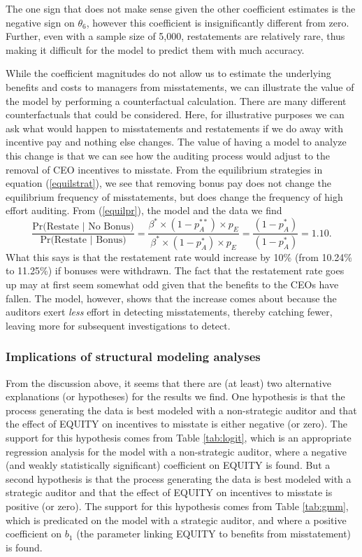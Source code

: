 The one sign that does not make sense given the other coefficient estimates is the negative sign on $\theta_6$, however this coefficient is insignificantly different from zero.
Further, even with a sample size of 5,000, restatements are relatively rare, thus making it difficult for the model to predict them with much accuracy. 

While the coefficient magnitudes do not allow us to estimate the underlying benefits and costs to managers from misstatements, we can illustrate the value of the model by performing a counterfactual calculation.
There are many different counterfactuals that could be considered. 
Here, for illustrative purposes we can ask what would happen to misstatements and restatements if we  do away with incentive pay and nothing else changes.
The value of having a model to analyze this change is that we can see how the auditing process would adjust to the removal of CEO incentives to misstate. 
From the equilibrium strategies in equation (\ref{equilstrat}), we see that removing bonus pay does not change the equilibrium frequency of misstatements, but does change the frequency of high effort auditing.
From (\ref{equilpr}), the model and the data we find
$$ \dfrac{\mbox{Pr(Restate }\vert \mbox{ No Bonus)}}{\mbox{Pr(Restate }\vert \mbox{ Bonus)}}=\dfrac{\beta^* \times (1-p_A^{**}) \times p_{E}}
{\beta^* \times (1-p_A^{*}) \times p_{E}} = \dfrac{(1-p_A^*)}{(1-p_A^*)} = 1.10.$$
What this says is that the restatement rate would increase by 10\% (from 10.24\% to 11.25\%) if bonuses were withdrawn. 
The fact that the restatement rate goes up may at first seem somewhat odd given that the benefits to the CEOs have fallen. 
The model, however, shows that the increase  comes about because the auditors exert \emph{less} effort in detecting misstatements, thereby catching fewer, leaving more for subsequent investigations to detect.

\subsubsection{Implications of structural modeling analyses}
From the discussion above, it seems that there are (at least) two alternative explanations (or hypotheses) for the results we find.
One hypothesis is that the process generating the data is best modeled with a non-strategic auditor and that the effect of EQUITY on incentives to misstate is either negative (or zero).
The support for this hypothesis comes from Table \ref{tab:logit}, which is an appropriate regression analysis for the model with a non-strategic auditor, where a negative (and weakly statistically significant) coefficient on EQUITY is found.
But a second hypothesis is that the process generating the data is best modeled with a strategic auditor and that the effect of EQUITY on incentives to misstate is positive (or zero).
The support for this hypothesis comes from Table \ref{tab:gmm}, which is predicated on the model with a strategic auditor, and where a positive coefficient on $b_1$ (the parameter linking EQUITY to benefits from misstatement) is found.

